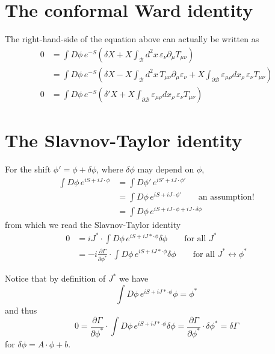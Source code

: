 \documentclass[12pt, oneside]{book}
\begin{document}
\section*{The conformal Ward identity}
The right-hand-side of the equation above can actually be written as
\begin{align*}
0
&=\int D\phi\,e^{-S}\left(\delta X+X\int_{\mathcal{B}}d^2x\,\varepsilon_{\nu}\partial_{\mu}T_{\mu\nu}\right)\\
&=\int D\phi\,e^{-S}\left(\delta X-X\int_{\mathcal{B}}d^2x\,T_{\mu\nu}\partial_{\mu}\varepsilon_{\nu}+X\int_{\partial\mathcal{B}}\varepsilon_{\mu\rho}dx_{\rho}\,\varepsilon_{\nu}T_{\mu\nu}\right)\\[10pt]
0
&=\int D\phi\,e^{-S}\left(\delta'X+X\int_{\partial\mathcal{B}}\varepsilon_{\mu\rho}dx_{\rho}\,\varepsilon_{\nu}T_{\mu\nu}\right)
\end{align*}

\section*{The Slavnov-Taylor identity}
For the shift $\phi'=\phi+\delta\phi$, where $\delta\phi$ may depend on $\phi$,
\begin{align*}
\int D\phi\,e^{iS+iJ\cdot\phi}
&=\int D\phi'\,e^{iS'+iJ\cdot\phi'}\\
&=\int D\phi\,e^{iS+iJ\cdot\phi'}\qquad
\text{an assumption!}\\
&=\int D\phi\,e^{iS+iJ\cdot\phi+iJ\cdot\delta\phi}
\end{align*}
from which we read the Slavnov-Taylor identity
\begin{align*}
0
&=iJ^*\cdot\int D\phi\,e^{iS+iJ*\cdot\phi}\delta\phi\qquad
\text{for all $J^*$}\\
&=-i\frac{\partial\Gamma}{\partial\phi^*}\cdot\int D\phi\,e^{iS+iJ*\cdot\phi}\delta\phi\qquad
\text{for all $J^*\leftrightarrow\phi^*$}
\end{align*}

Notice that by definition of $J^*$ we have
\[
\int D\phi\,e^{iS+iJ*\cdot\phi}\phi=\phi^*
\]
and thus
\[
0=\frac{\partial\Gamma}{\partial\phi^*}\cdot\int D\phi\,e^{iS+iJ*\cdot\phi}\delta\phi=\frac{\partial\Gamma}{\partial\phi^*}\cdot\delta\phi^*=\delta\Gamma
\]
for $\delta\phi=A\cdot\phi+b$.
\end{document}
